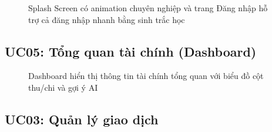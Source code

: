 \begin{figure}[H]
\centering
{}
\hspace{1cm}
\caption{Splash Screen có animation chuyên nghiệp và trang Đăng nhập hỗ trợ cả đăng nhập nhanh bằng sinh trắc học}
\label{fig:ui-auth}
\end{figure}

\subsection{UC05: Tổng quan tài chính (Dashboard)}

\begin{figure}[H]
\centering
{}
\hspace{1cm}
\caption{Dashboard hiển thị thông tin tài chính tổng quan với biểu đồ cột thu/chi và gợi ý AI}
\label{fig:ui-overview}
\end{figure}

\subsection{UC03: Quản lý giao dịch}

